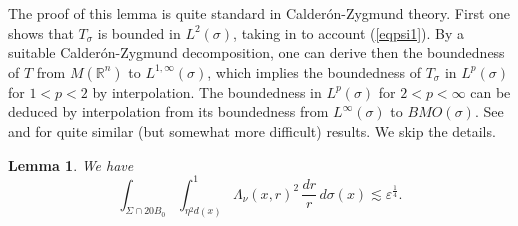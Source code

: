 \documentclass[11pt]{amsart}
\newcommand{\R}{{\mathbb R}}       %
\newcommand{\rf}[1]{{(\ref{#1})}}
\newcommand{\ve}{{\varepsilon}}
\newtheorem{lemma}[theorem]{Lemma}
\theoremstyle{definition}
\theoremstyle{remark}
\numberwithin{equation}{section}
\def\lec{\lesssim}
\def\lec{\lesssim}
\begin{document}
The proof of this lemma is quite standard in Calder\'on-Zygmund theory. First one shows that 
$T_\sigma$ is bounded in $L^2(\sigma)$, taking in to account
\rf{eqpsi1}. By a suitable Calder\'on-Zygmund decomposition, one can derive then the boundedness of
$T$ from $M(\R^n)$ to $L^{1,\infty}(\sigma)$, which implies the boundedness of $T_\sigma$ in $L^p(\sigma)$
for $1<p<2$ by interpolation. The boundedness in $L^p(\sigma)$
for $2<p<\infty$ can be deduced by interpolation from its boundedness from $L^\infty(\sigma)$ to $BMO(\sigma)$.
See \cite[Theorem 5.1]{TT15} and  \cite[Proposition 13.7]{Tol17} for quite similar  (but somewhat more difficult) results. We skip the
details.



\begin{lemma}
We have
	\begin{equation}\label{e:nu-int1}
	\int_{\Sigma \cap 20 B_{0}}\int_{\eta^2 d(x) }^{1}  \Lambda_{\nu}(x,r)^{2}\,\frac{dr}{r}\, d\sigma(x) \lec \ve^{\frac{1}{4}}.
	\end{equation}
\end{lemma}
\end{document}
